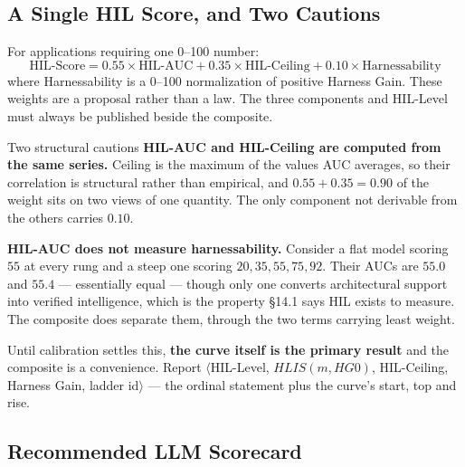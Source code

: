\documentclass[11pt]{article}
\theoremstyle{definition}
\begin{document}
\subsection{A Single HIL Score, and Two Cautions}\label{sec:composite}

For applications requiring one 0--100 number:
\begin{equation}
\text{HIL-Score} = 0.55 \times \text{HIL-AUC} + 0.35 \times \text{HIL-Ceiling} + 0.10 \times \text{Harnessability}
\end{equation}
where Harnessability is a 0--100 normalization of positive Harness Gain. These weights are a proposal rather than a law. The three components and HIL-Level must always be published beside the composite.

\begin{cautionbox}{Two structural cautions}
\textbf{HIL-AUC and HIL-Ceiling are computed from the same series.} Ceiling is the maximum of the values AUC averages, so their correlation is structural rather than empirical, and $0.55 + 0.35 = 0.90$ of the weight sits on two views of one quantity. The only component not derivable from the others carries $0.10$.

\textbf{HIL-AUC does not measure harnessability.} Consider a flat model scoring $55$ at every rung and a steep one scoring $20, 35, 55, 75, 92$. Their AUCs are $55.0$ and $55.4$ --- essentially equal --- though only one converts architectural support into verified intelligence, which is the property \S14.1 says HIL exists to measure. The composite does separate them, through the two terms carrying least weight.

Until calibration settles this, \textbf{the curve itself is the primary result} and the composite is a convenience. Report $\langle$HIL-Level, $HLIS(m,HG0)$, HIL-Ceiling, Harness Gain, ladder id$\rangle$ --- the ordinal statement plus the curve's start, top and rise.
\end{cautionbox}

\subsection{Recommended LLM Scorecard}
\end{document}
